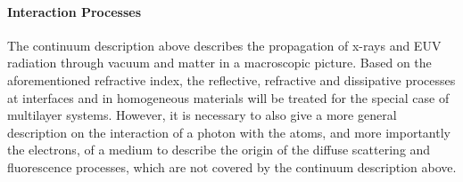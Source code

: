 \paragraph{Interaction Processes}
The continuum description above describes the propagation of x-rays and EUV radiation through vacuum and matter in a macroscopic picture. Based on the aforementioned refractive index, the reflective, refractive and dissipative processes at interfaces and in homogeneous materials will be treated for the special case of multilayer systems. However, it is necessary to also give a more general description on the interaction of a photon with the atoms, and more importantly the electrons, of a medium to describe the origin of the diffuse scattering and fluorescence processes, which are not covered by the continuum description above.

